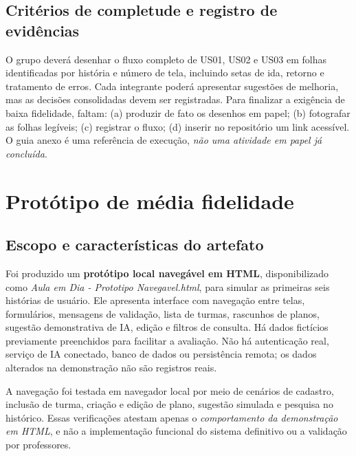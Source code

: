 \documentclass[12pt,a4paper,oneside]{report}
\begin{document}
\subsection{Critérios de completude e registro de evidências}
O grupo deverá desenhar o fluxo completo de US01, US02 e US03 em folhas identificadas por história e número de tela, incluindo setas de ida, retorno e tratamento de erros. Cada integrante poderá apresentar sugestões de melhoria, mas as decisões consolidadas devem ser registradas. Para finalizar a exigência de baixa fidelidade, faltam: (a) produzir de fato os desenhos em papel; (b) fotografar as folhas legíveis; (c) registrar o fluxo; (d) inserir no repositório um link acessível. O guia anexo é uma referência de execução, \emph{não uma atividade em papel já concluída}.

\section{Protótipo de média fidelidade}
\subsection{Escopo e características do artefato}
Foi produzido um \textbf{protótipo local navegável em HTML}, disponibilizado como \textit{Aula em Dia - Prototipo Navegavel.html}, para simular as primeiras seis histórias de usuário. Ele apresenta interface com navegação entre telas, formulários, mensagens de validação, lista de turmas, rascunhos de planos, sugestão demonstrativa de IA, edição e filtros de consulta. Há dados fictícios previamente preenchidos para facilitar a avaliação. Não há autenticação real, serviço de IA conectado, banco de dados ou persistência remota; os dados alterados na demonstração não são registros reais.

A navegação foi testada em navegador local por meio de cenários de cadastro, inclusão de turma, criação e edição de plano, sugestão simulada e pesquisa no histórico. Essas verificações atestam apenas o \textit{comportamento da demonstração em HTML}, e não a implementação funcional do sistema definitivo ou a validação por professores.
\end{document}
